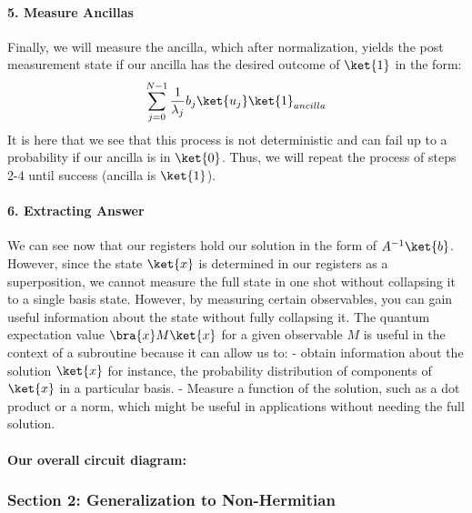 \documentclass[11pt]{article}
\begin{document}
\paragraph{\texorpdfstring{\textbf{5. Measure
Ancillas}}{5. Measure Ancillas}}\label{measure-ancillas}

Finally, we will measure the ancilla, which after normalization, yields
the post measurement state if our ancilla has the desired outcome of
\(\ket{1}\) in the form:
\[\sum_{j=0}^{N-1}\frac{1}{\lambda_{j}}b_{j}\ket{u_{j}}\ket{1}_{ancilla}\]
It is here that we see that this process is not deterministic and can
fail up to a probability if our ancilla is in \(\ket{0}\). Thus, we will
repeat the process of steps 2-4 until success (ancilla is \(\ket{1}\)).

\paragraph{\texorpdfstring{\textbf{6. Extracting
Answer}}{6. Extracting Answer}}\label{extracting-answer}

We can see now that our registers hold our solution in the form of
\(A^{-1}\ket{b}\). However, since the state \(\ket{x}\) is determined in
our registers as a superposition, we cannot measure the full state in
one shot without collapsing it to a single basis state. However, by
measuring certain observables, you can gain useful information about the
state without fully collapsing it. The quantum expectation value
\(\bra{x}M\ket{x}\) for a given observable \(M\) is useful in the
context of a subroutine because it can allow us to: - obtain information
about the solution \(\ket{x}\) for instance, the probability
distribution of components of \(\ket{x}\) in a particular basis. -
Measure a function of the solution, such as a dot product or a norm,
which might be useful in applications without needing the full solution.

\paragraph{\texorpdfstring{\textbf{Our overall circuit
diagram:}}{Our overall circuit diagram:}}\label{our-overall-circuit-diagram}

    \subsubsection{Section 2: Generalization to
Non-Hermitian}\label{section-2-generalization-to-non-hermitian}
\end{document}
